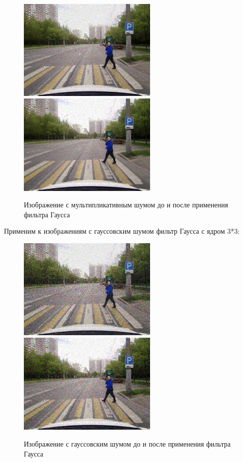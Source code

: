 \begin{figure}[hbt!]
    \centering
    \includegraphics[width=0.6\textwidth]{../outputs/image_mltp_noise.png}
    \includegraphics[width=0.6\textwidth]{../addition/image_mltp_median_filter_k3.png}
    \caption{Изображение с мультипликативным шумом до и после применения фильтра Гаусса}
    \label{fig:stich_images}
\end{figure}

\pagebreak
Применим к изображениям с гауссовским шумом фильтр Гаусса с ядром 3*3:

\begin{figure}[hbt!]
    \centering
    \includegraphics[width=0.6\textwidth]{../outputs/image_gauss_noise.png}
    \includegraphics[width=0.6\textwidth]{../addition/image_gauss_median_filter_k3.png}
    \caption{Изображение с гауссовским шумом до и после применения фильтра Гаусса}
    \label{fig:stich_images}
\end{figure}

